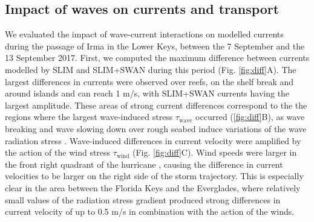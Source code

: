 \documentclass[11pt,a4paper]{article}
\begin{document}
\subsection{Impact of waves on currents and transport}

We evaluated the impact of wave-current interactions on modelled currents during the passage of Irma in the Lower Keys, between the 7 September and the 13 September 2017. First, we computed the maximum difference between currents modelled by SLIM and SLIM+SWAN during this period (Fig. \ref{fig:diff}A). The largest differences in currents were observed over reefs, on the shelf break and around islands and can reach 1 m/s, with SLIM+SWAN currents having the largest amplitude. These areas of strong current differences correspond to the  the regions where the largest wave-induced stress {\boldmath$\tau$}$_\text{wave}$ occurred (\ref{fig:diff}B), as wave breaking and wave slowing down over rough seabed induce variations of the wave radiation stress \citep{longuet1964radiation}. Wave-induced differences in current velocity were amplified by the action of the wind stress {\boldmath$\tau$}$_\text{wind}$ (Fig. \ref{fig:diff}C). Wind speeds were larger in the front right quadrant of the hurricane \citep{zedler2009ocean}, causing the difference in current velocities to be larger on the right side of the storm trajectory. This is especially clear in the area between the Florida Keys and the Everglades, where relatively small values of the radiation stress gradient produced strong differences in current velocity of up to 0.5 m/s in combination with the action of the winds.
\end{document}
